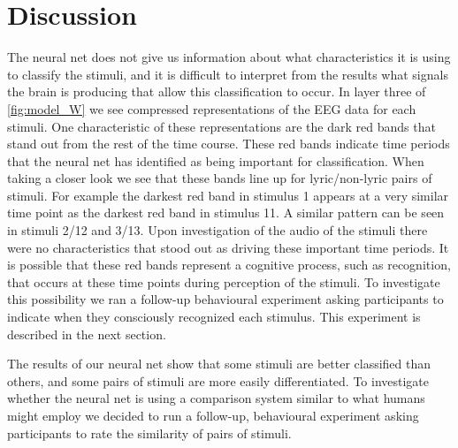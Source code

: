 \section{Discussion}
The neural net does not give us information about what characteristics it is using to classify the stimuli, and it is difficult to interpret from the results what signals the brain is producing that allow this classification to occur. 
In layer three of \autoref{fig:model_W} we see compressed representations of the EEG data for each stimuli. 
One characteristic of these representations are the dark red bands that stand out from the rest of the time course. 
These red bands indicate time periods that the neural net has identified as being important for classification. 
When taking a closer look we see that these bands line up for lyric/non-lyric pairs of stimuli. 
For example the darkest red band in stimulus 1 appears at a very similar time point as the darkest red band in stimulus 11.
A similar pattern can be seen in stimuli 2/12 and 3/13.
Upon investigation of the audio of the stimuli there were no characteristics that stood out as driving these important time periods.
It is possible that these red bands represent a cognitive process, such as recognition, that occurs at these time points during perception of the stimuli. 
To investigate this possibility we ran a follow-up behavioural experiment asking participants to indicate when they consciously recognized each stimulus. 
This experiment is described in the next section.

The results of our neural net show that some stimuli are better classified than others, and some pairs of stimuli are more easily differentiated. 
To investigate whether the neural net is using a comparison system similar to what humans might employ we decided to run a follow-up, behavioural experiment asking participants to rate the similarity of pairs of stimuli. 

